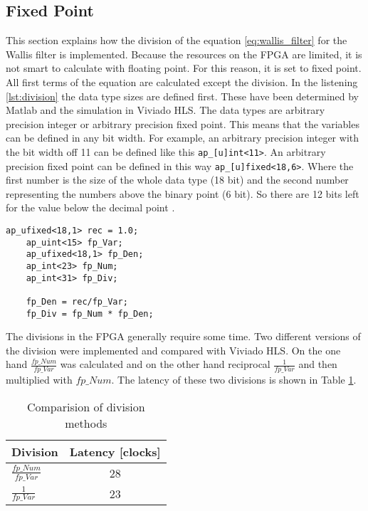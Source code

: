 \subsection{Fixed Point}
This section explains how the division of the equation \ref{eq:wallis_filter} for the Wallis filter is implemented. Because the resources on the FPGA are limited, it is not smart to calculate with floating point. For this reason, it is set to fixed point. \\
All first terms of the equation are calculated except the division. In the listening \ref{lst:division} the data type sizes are defined first. These have been determined by Matlab and the simulation in Viviado HLS. 
The data types are arbitrary precision integer or arbitrary precision fixed point. This means that the variables can be defined in any bit width. For example, an arbitrary precision integer with the bit width off 11 can be defined like this \texttt{ap\_[u]int<11>}. An arbitrary precision fixed point can be defined in this way \texttt{ap\_[u]fixed<18,6>}. Where the first number is the size of the whole data type (18 bit) and the second number representing the numbers above the binary point (6 bit). So there are 12 bits left for the value below the decimal point \cite{ug902}. \\   
\begin{minipage}{\textwidth}
\begin{lstlisting}[style=CStyle, caption=Calculation of the division for the Wallis filter, label=lst:division]
	ap_ufixed<18,1> rec = 1.0;
	ap_uint<15> fp_Var;
	ap_ufixed<18,1> fp_Den;
	ap_int<23> fp_Num;
	ap_int<31> fp_Div;

	fp_Den = rec/fp_Var;
	fp_Div = fp_Num * fp_Den;
\end{lstlisting}
\end{minipage}

The divisions in the FPGA generally require some time. Two different versions of the division were implemented and compared with Viviado HLS. On the one hand $\frac{fp\_Num}{fp\_Var}$ was calculated and on the other hand reciprocal $\frac{1}{fp\_Var}$ and then multiplied with $fp\_Num$. The latency of these two divisions is shown in Table \ref{tab:c_div}. 
\begin{table}[tb!]
    \centering
    \begin{tabular}{l c}
        \toprule
        Division & Latency [clocks]  \\
        \midrule
        $\frac{fp\_Num}{fp\_Var}$ & 28 
        \\
        $\frac{1}{fp\_Var}$ & 23 
        \\
        \bottomrule
    \end{tabular}
    \caption{Comparision of division methods}
    \label{tab:c_div}
\end{table}

